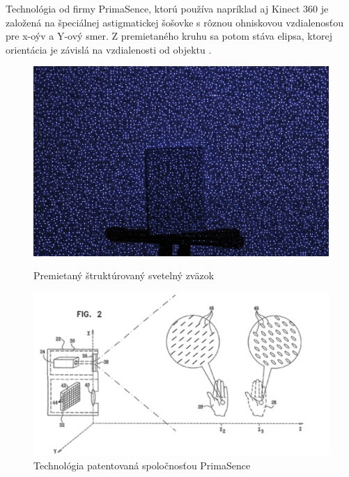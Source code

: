 Technológia od firmy PrimaSence, ktorú používa napríklad aj Kinect 360 je založená na špeciálnej astigmatickej šošovke s rôznou  ohniskovou vzdialenosťou pre x-oýv a Y-ový smer. Z premietaného kruhu sa potom stáva elipsa, ktorej orientácia je závislá na vzdialenosti od objektu \cite{how_kinect_work}.

\begin{figure}[H]
  \centering
  \begin{minipage}[b]{0.40\textwidth}
    \includegraphics[width=\textwidth]{images/kinect_projector}
    \caption{Premietaný štruktúrovaný svetelný zväzok}
  \end{minipage}
  \hfill
  \begin{minipage}[b]{0.5\textwidth}
    \includegraphics[width=\textwidth]{images/primasence}
    \caption{Technológia patentovaná spoločnosťou PrimaSence}
  \end{minipage}
\end{figure}





